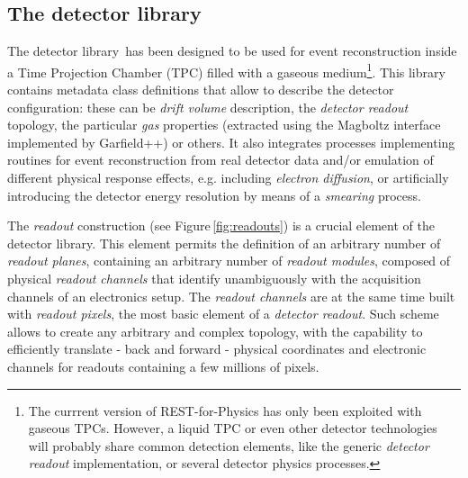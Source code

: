 \subsection{The detector library}

The detector library\,\cite{REST_Detector_Git} has been designed to be used for event reconstruction inside a Time Projection Chamber (TPC) filled with a gaseous medium\footnote{The currrent version of REST-for-Physics has only been exploited with gaseous TPCs. However, a liquid TPC or even other detector technologies will probably share common detection elements, like the generic \emph{detector readout} implementation, or several detector physics processes. }. This library contains metadata class definitions that allow to describe the detector configuration: these can be \emph{drift volume} description, the \emph{detector readout} topology, the particular \emph{gas} properties (extracted using the Magboltz interface implemented by Garfield++) or others. It also integrates processes implementing routines for event reconstruction from real detector data and/or emulation of different physical response effects, e.g. including \emph{electron diffusion}, or artificially introducing the detector energy resolution by means of a \emph{smearing} process.

The \emph{readout} construction (see Figure\,\ref{fig:readouts}) is a crucial element of the detector library. This element permits the definition of an arbitrary number of \emph{readout planes}, containing an arbitrary number of \emph{readout modules}, composed of physical \emph{readout channels} that identify unambiguously with the acquisition channels of an electronics setup. The \emph{readout channels} are at the same time built with \emph{readout pixels}, the most basic element of a \emph{detector readout}. Such scheme allows to create any arbitrary and complex topology, with the capability to efficiently translate - back and forward - physical coordinates and electronic channels for readouts containing a few millions of pixels.

